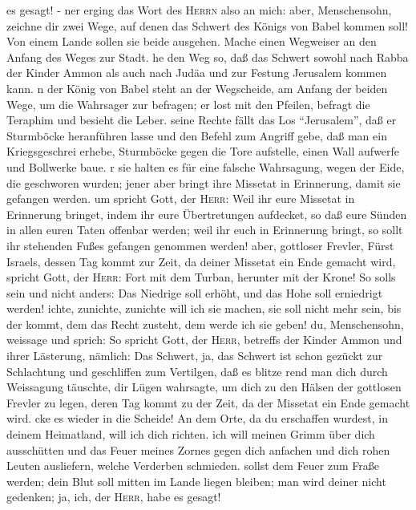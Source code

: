 es gesagt! -  ner erging das Wort des \textsc{Herrn} also
an mich:  aber, Menschensohn, zeichne dir zwei Wege, auf
denen das Schwert des Königs von Babel kommen soll! Von einem Lande
sollen sie beide ausgehen. Mache einen Wegweiser an den Anfang des Weges
zur Stadt.  he den Weg so, daß das Schwert sowohl nach
Rabba der Kinder Ammon als auch nach Judäa und zur Festung Jerusalem
kommen kann.  n der König von Babel steht an der
Wegscheide, am Anfang der beiden Wege, um die Wahrsager zur befragen; er
lost mit den Pfeilen, befragt die Teraphim und besieht die Leber.
 seine Rechte fällt das Los ``Jerusalem'', daß er
Sturmböcke heranführen lasse und den Befehl zum Angriff gebe, daß man
ein Kriegsgeschrei erhebe, Sturmböcke gegen die Tore aufstelle, einen
Wall aufwerfe und Bollwerke baue.  r sie halten es für
eine falsche Wahrsagung, wegen der Eide, die geschworen wurden; jener
aber bringt ihre Missetat in Erinnerung, damit sie gefangen werden.
 um spricht Gott, der \textsc{Herr}: Weil ihr eure
Missetat in Erinnerung bringet, indem ihr eure Übertretungen aufdecket,
so daß eure Sünden in allen euren Taten offenbar werden; weil ihr euch
in Erinnerung bringt, so sollt ihr stehenden Fußes gefangen genommen
werden!  aber, gottloser Frevler, Fürst Israels, dessen
Tag kommt zur Zeit, da deiner Missetat ein Ende gemacht wird,
 spricht Gott, der \textsc{Herr}: Fort mit dem Turban,
herunter mit der Krone! So soll\textquotesingle s sein und nicht anders:
Das Niedrige soll erhöht, und das Hohe soll erniedrigt werden!
 ichte, zunichte, zunichte will ich sie machen, sie soll
nicht mehr sein, bis der kommt, dem das Recht zusteht, dem werde ich sie
geben!  du, Menschensohn, weissage und sprich: So spricht
Gott, der \textsc{Herr}, betreffs der Kinder Ammon und ihrer Lästerung,
nämlich: Das Schwert, ja, das Schwert ist schon gezückt zur Schlachtung
und geschliffen zum Vertilgen, daß es blitze  rend man
dich durch Weissagung täuschte, dir Lügen wahrsagte, um dich zu den
Hälsen der gottlosen Frevler zu legen, deren Tag kommt zu der Zeit, da
der Missetat ein Ende gemacht wird.  cke es wieder in die
Scheide! An dem Orte, da du erschaffen wurdest, in deinem Heimatland,
will ich dich richten.  ich will meinen Grimm über dich
ausschütten und das Feuer meines Zornes gegen dich anfachen und dich
rohen Leuten ausliefern, welche Verderben schmieden. 
sollst dem Feuer zum Fraße werden; dein Blut soll mitten im Lande liegen
bleiben; man wird deiner nicht gedenken; ja, ich, der \textsc{Herr},
habe es gesagt!

